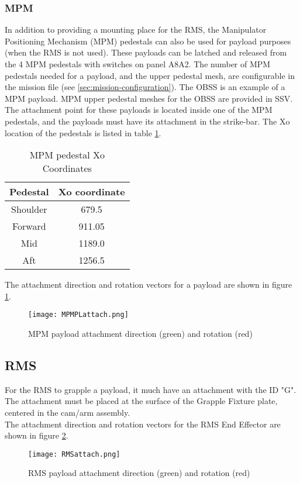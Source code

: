 \documentclass[Space_Shuttle_Vessel_Manual.tex]{subfiles}
\begin{document}
\begin{multicols*}{2}
\subsubsection{MPM}
In addition to providing a mounting place for the RMS, the Manipulator Positioning Mechanism (MPM) pedestals can also be used for payload purposes (when the RMS is not used). These payloads can be latched and released from the 4 MPM pedestals with switches on panel A8A2.
The number of MPM pedestals needed for a payload, and the upper pedestal mesh, are configurable in the mission file (see \ref{sec:mission-configuration}). The OBSS is an example of a MPM payload. MPM upper pedestal meshes for the OBSS are provided in SSV.\\
The attachment point for these payloads is located inside one of the MPM pedestals, and the payloads must have its attachment in the strike-bar. The Xo location of the pedestals is listed in table \ref{tab:MPMCoordinates}.

\begin{table}[H]
  \centering
  \begin{tabularx}{125pt}{c | c}
    \textbf{Pedestal} & \textbf{Xo coordinate} \\
    \hline
    Shoulder & 679.5 \\
    Forward & 911.05 \\
    Mid & 1189.0 \\
    Aft & 1256.5
  \end{tabularx}
  \caption{MPM pedestal Xo Coordinates}
  \label{tab:MPMCoordinates}
\end{table}

\noindent
The attachment direction and rotation vectors for a payload are shown in figure \ref{fig:MPMPLattach}.
\begin{figure}[H]
  \centering
  \captionsetup{justification=centering}
  \texttt{[image: MPMPLattach.png]}
  \caption{MPM payload attachment direction (green) and rotation (red)}
  \label{fig:MPMPLattach}
\end{figure}


\subsection{RMS}
For the RMS to grapple a payload, it much have an attachment with the ID "G". The attachment must be placed at the surface of the Grapple Fixture plate, centered in the cam/arm assembly.
\\
The attachment direction and rotation vectors for the RMS End Effector are shown in figure \ref{fig:RMSattach}.
\begin{figure}[H]
  \centering
  \captionsetup{justification=centering}
  \texttt{[image: RMSattach.png]}
  \caption{RMS payload attachment direction (green) and rotation (red)}
  \label{fig:RMSattach}
\end{figure}

\end{multicols*}
\end{document}
